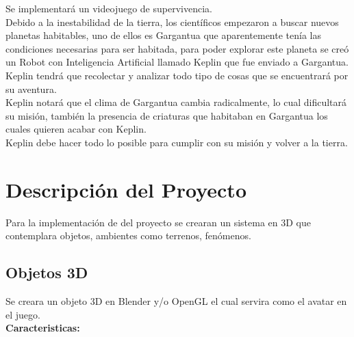 \documentclass[a4paper]{article}
\begin{document}
Se implementará un videojuego de supervivencia.\\
Debido a la inestabilidad de la tierra, los científicos empezaron a buscar nuevos planetas habitables, uno de ellos es Gargantua que aparentemente tenía las condiciones necesarias para ser habitada, para poder explorar este planeta se creó un Robot con Inteligencia Artificial llamado Keplin que fue enviado a Gargantua. Keplin tendrá que recolectar y analizar todo tipo de cosas que se encuentrará por su aventura.\\
Keplin notará que el clima de Gargantua cambia radicalmente, lo cual dificultará su misión, también la presencia de criaturas que habitaban en Gargantua los cuales quieren acabar con Keplin.\\
Keplin debe hacer todo lo posible para cumplir con su misión y volver a la tierra.


\pagebreak

\section{Descripción del Proyecto}

Para la implementación de del proyecto se crearan un sistema en 3D que 
contemplara objetos, ambientes como terrenos, fenómenos.\\

\subsection{Objetos 3D}
Se creara un objeto 3D en Blender y/o OpenGL el cual servira como el avatar en el juego.\\

\textbf{Caracteristicas:}
\end{document}
